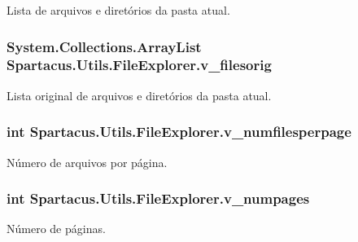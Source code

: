Lista de arquivos e diretórios da pasta atual. 

\hypertarget{classSpartacus_1_1Utils_1_1FileExplorer_adb13bc5f2309ceb21861d1a84caf7f98}{
\subsubsection[{v\+\_\+filesorig}]{\setlength{\rightskip}{0pt plus 5cm}System.\+Collections.\+Array\+List Spartacus.\+Utils.\+File\+Explorer.\+v\+\_\+filesorig}}\label{classSpartacus_1_1Utils_1_1FileExplorer_adb13bc5f2309ceb21861d1a84caf7f98}


Lista original de arquivos e diretórios da pasta atual. 

\hypertarget{classSpartacus_1_1Utils_1_1FileExplorer_abbf2deab4665a8be42c23393bdbf54df}{
\subsubsection[{v\+\_\+numfilesperpage}]{\setlength{\rightskip}{0pt plus 5cm}int Spartacus.\+Utils.\+File\+Explorer.\+v\+\_\+numfilesperpage}}\label{classSpartacus_1_1Utils_1_1FileExplorer_abbf2deab4665a8be42c23393bdbf54df}


Número de arquivos por página. 

\hypertarget{classSpartacus_1_1Utils_1_1FileExplorer_a8017af938b655e57eb51eb83fba48ed6}{
\subsubsection[{v\+\_\+numpages}]{\setlength{\rightskip}{0pt plus 5cm}int Spartacus.\+Utils.\+File\+Explorer.\+v\+\_\+numpages}}\label{classSpartacus_1_1Utils_1_1FileExplorer_a8017af938b655e57eb51eb83fba48ed6}


Número de páginas. 

